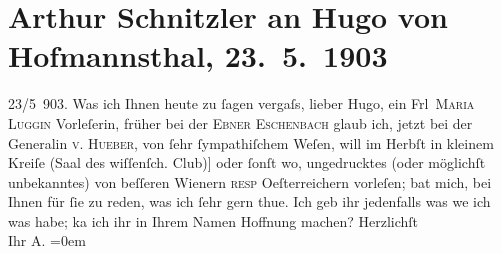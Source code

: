 

         
         \renewcommand{\erwaehntePersonen}{Personen: Marie von Ebner-Eschenbach, Hugo von Hofmannsthal, Henriette von Hueber, Marie Luggin}
         \renewcommand{\erwaehnteOrte}{Orte: Saal des wissenschaftlichen Clubs, Wien, Österreich}
         \renewcommand{\erwaehnteWerke}{}
               \section[Arthur Schnitzler an Hugo von Hofmannsthal, 23. 5. 1903]{ Arthur Schnitzler an Hugo von Hofmannsthal, 23. 5. 1903}\nopagebreak{}\rehead{ }\begin{ledgroupsized}[t]{13cm}\normalsize\beginnumbering{} \toendnotes[C]{\smallbreak\pagebreak[2]} 
\pstart
           \raggedleft{}{\pb}23/5 903.\pend
           \pstart
           Was ich Ihnen heute zu ſagen vergaſs, lieber Hugo, ein Frl \textsc{Maria Luggin} Vorleſerin, früher bei der \textsc{Ebner Eschenbach} glaub ich, jetzt bei der Generalin \textsc{v. Hueber}, von ſehr ſympathiſchem Weſen, will im Herbſt in kleinem Kreiſe
                  (Saal des wiſſenſch. Club\oindex{Saal des wissenschaftlichen Clubs@\textbf{Saal des wissenschaftlichen Clubs}|pw}{[}){]}{ }{\pb}oder ſonſt wo, ungedrucktes (oder möglichſt unbekanntes)
               von beſſeren Wienern \textsc{resp}{ }Oeſterreichern vorleſen; bat mich, bei Ihnen
               für ſie zu reden, was ich ſehr gern thue. Ich geb ihr jedenfalls was we{\geminationn} ich was habe; ka{\geminationn} ich ihr
               in Ihrem {\pb}Namen Hoffnung machen?\pend
           \pstart
           Herzlichſt{\\[\baselineskip]}Ihr \spacefill\mbox{A.}\pend
           \leftskip=0em{}
         
         \endnumbering{}\end{ledgroupsized}  \newcommand{\dateiname}{L01292}\newcommand{\titel}{Arthur Schnitzler an Hugo von Hofmannsthal, 23. 5. 1903}\newcommand{\editorInnen}{Martin Anton Müller und Gerd-Hermann Susen}
      